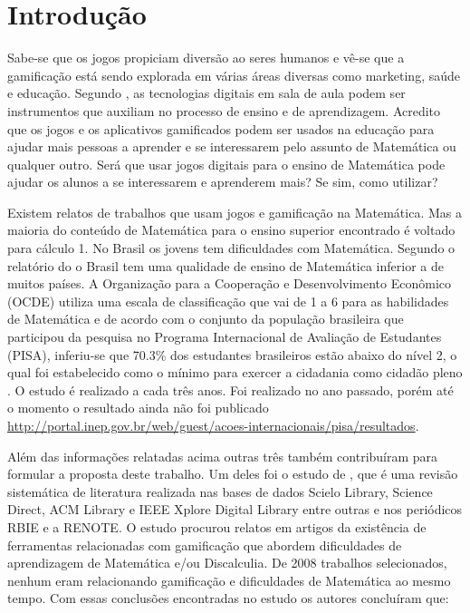 \chapter[Introdução]{Introdução}


Sabe-se que os jogos propiciam diversão ao seres humanos e vê-se que a gamificação está sendo explorada em várias áreas diversas como marketing, saúde e educação. Segundo \cite{revbibmatgam}, as tecnologias digitais em sala de aula podem ser instrumentos que auxiliam no processo de ensino e de aprendizagem. Acredito que os jogos e os aplicativos gamificados podem ser usados na educação para ajudar mais pessoas a aprender e se interessarem pelo assunto de Matemática ou qualquer outro. Será que usar jogos digitais para o ensino de Matemática pode ajudar os alunos a se interessarem e aprenderem mais? Se sim, como utilizar? 

Existem relatos de trabalhos que usam jogos e gamificação na Matemática. Mas a maioria do conteúdo de Matemática para o ensino superior encontrado é voltado para cálculo 1. No Brasil os jovens tem dificuldades com Matemática. Segundo o relatório do \cite{inep2015nivelcidadania} o Brasil tem uma qualidade de ensino de Matemática inferior a de muitos países. A Organização para a Cooperação e Desenvolvimento Econômico (OCDE) utiliza uma escala de classificação que vai de 1 a 6 para as habilidades de Matemática e de acordo com o conjunto da população brasileira que participou da pesquisa no Programa Internacional de Avaliação de Estudantes (PISA), inferiu-se que 70.3\% dos estudantes brasileiros estão abaixo do nível 2, o qual foi estabelecido como o mínimo para exercer a cidadania como cidadão pleno \cite{inep2015nivelcidadania}.
O estudo é realizado a cada três anos. Foi realizado no ano passado, porém até o momento o resultado ainda não foi publicado \url{http://portal.inep.gov.br/web/guest/acoes-internacionais/pisa/resultados}.

Além das informações relatadas acima outras três também contribuíram para formular a proposta deste trabalho. Um deles foi o estudo de \cite{revbibmatgam}, que é uma revisão sistemática de literatura realizada nas bases de dados Scielo Library, Science Direct, ACM Library e IEEE Xplore Digital Library entre outras e nos periódicos RBIE e a RENOTE. O estudo procurou relatos em artigos da existência de ferramentas relacionadas com gamificação que abordem dificuldades de aprendizagem de Matemática e/ou Discalculia. De 2008 trabalhos selecionados, nenhum eram relacionando gamificação e dificuldades de Matemática ao mesmo tempo. Com essas conclusões encontradas no estudo os autores \cite{revbibmatgam} concluíram que:

